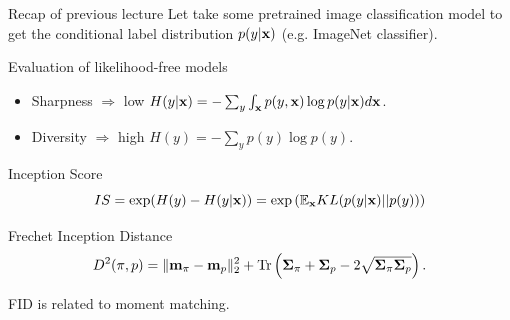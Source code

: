 \begin{frame}{Recap of previous lecture}
	Let take some pretrained image classification model to get the conditional label distribution $p(y | \mathbf{x})$ (e.g. ImageNet classifier).
	\begin{block}{Evaluation of likelihood-free models}
		\begin{itemize}
			\item Sharpness $\Rightarrow$ low $H(y | \mathbf{x}) = - \sum_{y} \int_{\mathbf{x}} p(y, \mathbf{x}) \log p(y | \mathbf{x}) d\mathbf{x}$.
			\item Diversity $\Rightarrow$ high $H(y)  = - \sum_{y} p(y) \log p(y)$.
		\end{itemize}
	\end{block}
	\vspace{-0.3cm}
	\begin{block}{Inception Score}
		\vspace{-0.2cm}
		\[
			IS = \exp(H(y) - H(y | \mathbf{x})) = \exp \left( \mathbb{E}_{\mathbf{x}} KL(p(y | \mathbf{x}) || p(y)) \right)
		\]
		\vspace{-0.5cm}
	\end{block}
	\begin{block}{Frechet Inception Distance}
		\vspace{-0.3cm}
		\[
			D^2 (\pi, p) = \| \mathbf{m}_{\pi} - \mathbf{m}_{p}\|_2^2 + \text{Tr} \left( \boldsymbol{\Sigma}_{\pi} + \boldsymbol{\Sigma}_p - 2 \sqrt{\boldsymbol{\Sigma}_{\pi} \boldsymbol{\Sigma}_p} \right).
		\]
		\vspace{-0.5cm}
	\end{block}
	FID is related to moment matching.
	
\end{frame}

